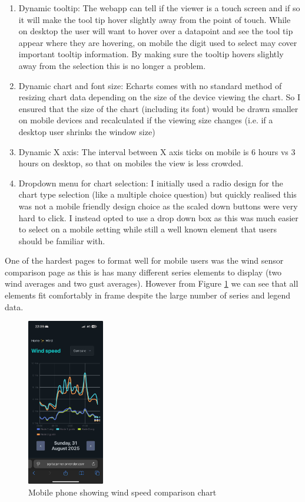 \begin{enumerate}
    \item Dynamic tooltip: The webapp can tell if the viewer is a touch screen
          and if so it will make the tool tip hover slightly away from the point
          of touch. While on desktop the user will want to hover over a
          datapoint and see the tool tip appear where they are hovering, on
          mobile the digit used to select may cover important tooltip
          information. By making sure the tooltip hovers slightly away from the
          selection this is no longer a problem.
    \item Dynamic chart and font size: Echarts comes with no standard method of
          resizing chart data depending on the size of the device viewing the
          chart. So I ensured that the size of the chart (including its font)
          would be drawn smaller on mobile devices and recalculated if the
          viewing size changes (i.e. if a desktop user shrinks the window size)
    \item Dynamic X axis: The interval between X axis ticks on mobile is 6 hours
          vs 3 hours on desktop, so that on mobiles the view is less crowded.
    \item Dropdown menu for chart selection: I initially used a radio design for
          the chart type selection (like a multiple choice question) but quickly
          realised this was not a mobile friendly design choice as the scaled
          down buttons were very hard to click. I instead opted to use a drop
          down box as this was much easier to select on a mobile setting while
          still a well known element that users should be familiar with.
\end{enumerate}

One of the hardest pages to format well for mobile users was the wind sensor
comparison page as this is has many different series elements to display (two
wind averages and two gust averages). However from Figure \ref{fig:mobile-page}
we can see that all elements fit comfortably in frame despite the large number
of series and legend data.

\begin{figure}[H]
    \centering
    \includegraphics[width=0.3\textwidth]{contents/part-3/fig3/mobile-wind-speed-compare.jpeg}
    \caption{Mobile phone showing wind speed comparison chart}
    \label{fig:mobile-page}
\end{figure} 


